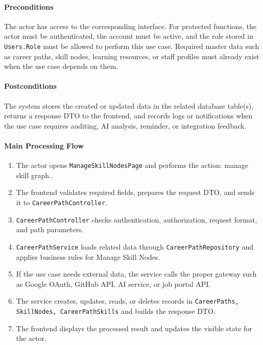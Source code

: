 \paragraph{Preconditions}

The actor has access to the corresponding interface. For protected functions, the actor must be authenticated, the account must be active, and the role stored in \texttt{Users.Role} must be allowed to perform this use case. Required master data such as career paths, skill nodes, learning resources, or staff profiles must already exist when the use case depends on them.

\paragraph{Postconditions}

The system stores the created or updated data in the related database table(s), returns a response DTO to the frontend, and records logs or notifications when the use case requires auditing, AI analysis, reminder, or integration feedback.

\paragraph{Main Processing Flow}

\begin{enumerate}
    \item The actor opens \texttt{ManageSkillNodesPage} and performs the action: manage skill graph..
    \item The frontend validates required fields, prepares the request DTO, and sends it to \texttt{CareerPathController}.
    \item \texttt{CareerPathController} checks authentication, authorization, request format, and path parameters.
    \item \texttt{CareerPathService} loads related data through \texttt{CareerPathRepository} and applies business rules for Manage Skill Nodes.
    \item If the use case needs external data, the service calls the proper gateway such as Google OAuth, GitHub API, AI service, or job portal API.
    \item The service creates, updates, reads, or deletes records in \texttt{CareerPaths, SkillNodes, CareerPathSkills} and builds the response DTO.
    \item The frontend displays the processed result and updates the visible state for the actor.
\end{enumerate}

